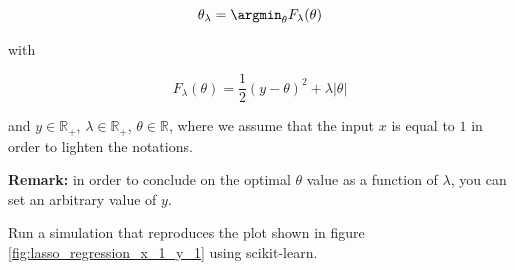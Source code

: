 \documentclass[
10pt, %
a4paper, %
oneside, %
headinclude,footinclude, %
BCOR5mm, %
]{scrartcl}
\begin{document}
    \begin{equation}
	\theta_{\lambda} = \argmin_{\theta}F_{\lambda}(\theta)
    \end{equation}

    with

    \begin{equation}
	F_{\lambda}(\theta) = \frac{1}{2}(y-\theta)^2+\lambda |\theta|
    \end{equation}

    and $y\in \mathbb{R}_{+}$, $\lambda\in \mathbb{R}_{+}$, $\theta\in \mathbb{R}$, where we assume that the input $x$ is equal to $1$ in order to lighten the notations.
    \\


    {

    \textbf{Remark:} in order to conclude on the optimal $\theta$ value as a function of $\lambda$, you can set an arbitrary value of $y$.

    Run a simulation that reproduces the plot shown in figure \ref{fig:lasso_regression_x_1_y_1} using scikit-learn.
}
\end{document}
